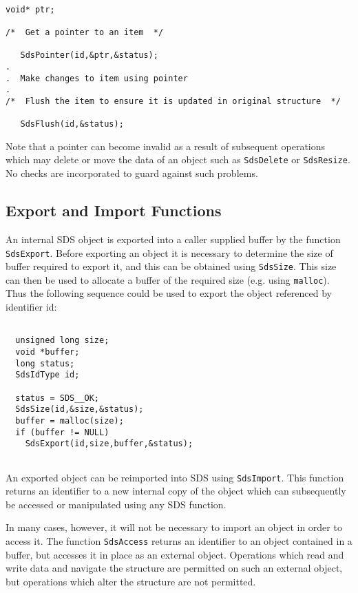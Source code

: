 \begin{verbatim}

void* ptr;

/*  Get a pointer to an item  */

   SdsPointer(id,&ptr,&status);
.
.  Make changes to item using pointer
.
/*  Flush the item to ensure it is updated in original structure  */

   SdsFlush(id,&status);

\end{verbatim}

Note that a pointer can become invalid as a result of subsequent operations
which may delete or move the data of an object such as \verb$SdsDelete$ or
\verb$SdsResize$. No checks are incorporated to guard against such problems.

\subsection{Export and Import Functions}

An internal SDS object is exported into a caller supplied buffer by the
function \verb$SdsExport$. Before exporting an object it is necessary to
determine the size of buffer required to export it, and this can be obtained
using \verb$SdsSize$. This size can then be used to allocate a buffer of the
required size (e.g. using \verb$malloc$). Thus the following sequence could be
used to export the object referenced by identifier id:

\begin{verbatim}

  unsigned long size;
  void *buffer;
  long status;
  SdsIdType id;

  status = SDS__OK;
  SdsSize(id,&size,&status);
  buffer = malloc(size);
  if (buffer != NULL)
    SdsExport(id,size,buffer,&status);
  
\end{verbatim}

An exported object can be reimported into SDS using \verb$SdsImport$. This
function returns an identifier to a new internal copy of the object which can
subsequently be accessed or manipulated using any SDS function.

In many cases, however, it will not be necessary to import an object in order
to access it. The function \verb$SdsAccess$ returns an identifier to an object
contained in a buffer, but accesses it in place as an external object. 
Operations which read and write data and navigate the structure are permitted
on such an external object, but operations which alter the structure are not
permitted.

